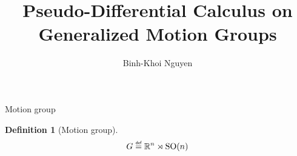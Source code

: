 \documentclass{beamer}
\title{Pseudo-Differential Calculus on Generalized Motion Groups}
\author{Binh-Khoi Nguyen}
\newtheorem{definition}[theorem]{Definition}
\begin{document}
\maketitle

\begin{frame}{Motion group}
    \begin{definition}[Motion group]
        \begin{align*}
            \Group \defeq \R^n \rtimes \SpecialOrthogonalGroup n
        \end{align*}
    \end{definition}
\end{frame}
\end{document}
